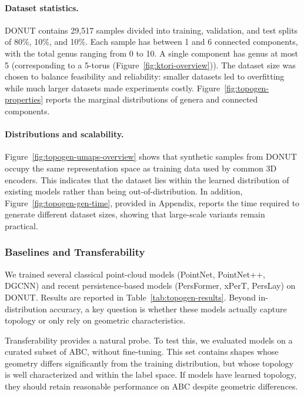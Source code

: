 \paragraph{Dataset statistics.}
DONUT contains 29,517 samples divided into training, validation, and test splits of 80\%, 10\%, and 10\%. Each sample has between 1 and 6 connected components, with the total genus ranging from 0 to 10. A single component has genus at most 5 (corresponding to a 5-torus (Figure~\ref{fig:ktori-overview})). The dataset size was chosen to balance feasibility and reliability: smaller datasets led to overfitting while much larger datasets made experiments costly. Figure~\ref{fig:topogen-properties} reports the marginal distributions of genera and connected components.

\paragraph{Distributions and scalability.}
Figure~\ref{fig:topogen-umaps-overview} shows that synthetic samples from DONUT occupy the same representation space as training data used by common 3D encoders. This indicates that the dataset lies within the learned distribution of existing models rather than being out-of-distribution. In addition, Figure~\ref{fig:topogen-gen-time}, provided in Appendix, reports the time required to generate different dataset sizes, showing that large-scale variants remain practical.


\subsubsection{Baselines and Transferability}
\label{sssec:topogen-transferability}

We trained several classical point-cloud models (PointNet, PointNet++, DGCNN) and recent persistence-based models (PersFormer, xPerT, PersLay) on DONUT. Results are reported in Table~\ref{tab:topogen-results}. Beyond in-distribution accuracy, a key question is whether these models actually capture topology or only rely on geometric characteristics.

Transferability provides a natural probe. To test this, we evaluated models on a curated subset of ABC, without fine-tuning. This set contains shapes whose geometry differs significantly from the training distribution, but whose topology is well characterized and within the label space. If models have learned topology, they should retain reasonable performance on ABC despite geometric differences.

